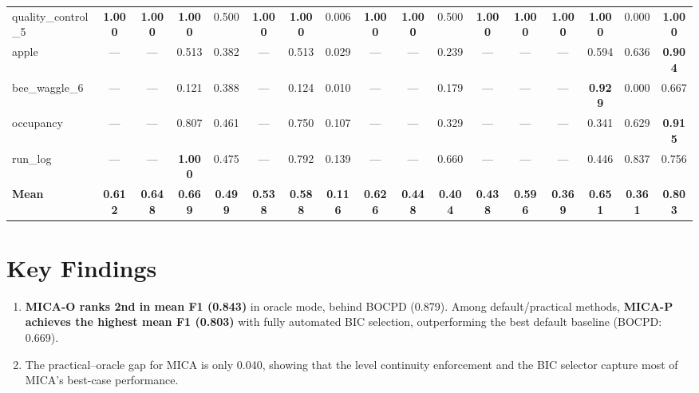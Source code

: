 \documentclass[11pt,a4paper]{article}
\begin{document}
\begin{table}
{\begin{tabular}{lcccccccccccccccc}
quality\_control\_5 & \textbf{1.000} & \textbf{1.000} & \textbf{1.000} & 0.500 & \textbf{1.000} & \textbf{1.000} & 0.006 & \textbf{1.000} & \textbf{1.000} & 0.500 & \textbf{1.000} & \textbf{1.000} & \textbf{1.000} & \textbf{1.000} & 0.000 & \textbf{1.000} \\
apple & — & — & 0.513 & 0.382 & — & 0.513 & 0.029 & — & — & 0.239 & — & — & — & 0.594 & 0.636 & \textbf{0.904} \\
bee\_waggle\_6 & — & — & 0.121 & 0.388 & — & 0.124 & 0.010 & — & — & 0.179 & — & — & — & \textbf{0.929} & 0.000 & 0.667 \\
occupancy & — & — & 0.807 & 0.461 & — & 0.750 & 0.107 & — & — & 0.329 & — & — & — & 0.341 & 0.629 & \textbf{0.915} \\
run\_log & — & — & \textbf{1.000} & 0.475 & — & 0.792 & 0.139 & — & — & 0.660 & — & — & — & 0.446 & 0.837 & 0.756 \\
\midrule
\textbf{Mean} & \textbf{0.612} & \textbf{0.648} & \textbf{0.669} & \textbf{0.499} & \textbf{0.538} & \textbf{0.588} & \textbf{0.116} & \textbf{0.626} & \textbf{0.448} & \textbf{0.404} & \textbf{0.438} & \textbf{0.596} & \textbf{0.369} & \textbf{0.651} & \textbf{0.361} & \textbf{0.803} \\
\bottomrule
\end{tabular}%
}
\end{table}
\clearpage


\newpage
\section{Key Findings}

\begin{enumerate}
    \item \textbf{MICA-O ranks 2nd in mean F1 (0.843)} in oracle mode, behind BOCPD (0.879). Among default/practical methods, \textbf{MICA-P achieves the highest mean F1 (0.803)} with fully automated BIC selection, outperforming the best default baseline (BOCPD: 0.669).
    \item The practical--oracle gap for MICA is only 0.040, showing that the level continuity enforcement and the BIC selector capture most of MICA's best-case performance.
\end{enumerate}
\end{document}
